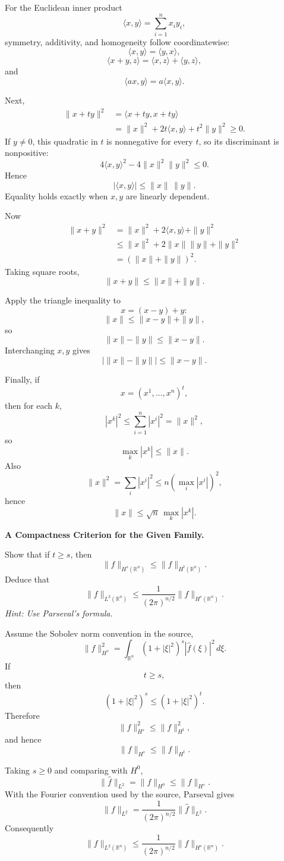 \begin{solution}
For the Euclidean inner product
\[
\langle x,y\rangle
=
\sum_{i=1}^{n}x_i y_i,
\]
symmetry, additivity, and homogeneity follow coordinatewise:
\[
\langle x,y\rangle=\langle y,x\rangle,
\]
\[
\langle x+y,z\rangle
=
\langle x,z\rangle+\langle y,z\rangle,
\]
and
\[
\langle ax,y\rangle
=
a\langle x,y\rangle.
\]

Next,
\[
\begin{aligned}
\|x+ty\|^2
&=
\langle x+ty,x+ty\rangle\\
&=
\|x\|^2+2t\langle x,y\rangle+t^2\|y\|^2
\ge0.
\end{aligned}
\]
If \(y\neq0\), this quadratic in \(t\) is nonnegative for every \(t\), so its discriminant is
nonpositive:
\[
4\langle x,y\rangle^2
-
4\|x\|^2\|y\|^2
\le0.
\]
Hence
\[
\boxed{
|\langle x,y\rangle|
\le
\|x\|\,\|y\|.
}
\]
Equality holds exactly when \(x,y\) are linearly dependent.

Now
\[
\begin{aligned}
\|x+y\|^2
&=
\|x\|^2+2\langle x,y\rangle+\|y\|^2\\
&\le
\|x\|^2+2\|x\|\|y\|+\|y\|^2\\
&=
(\|x\|+\|y\|)^2.
\end{aligned}
\]
Taking square roots,
\[
\boxed{\|x+y\|\le\|x\|+\|y\|.}
\]

Apply the triangle inequality to
\[
x=(x-y)+y:
\]
\[
\|x\|
\le
\|x-y\|+\|y\|,
\]
so
\[
\|x\|-\|y\|
\le
\|x-y\|.
\]
Interchanging \(x,y\) gives
\[
\boxed{
|\|x\|-\|y\||
\le
\|x-y\|.
}
\]

Finally, if
\[
x=(x^1,\ldots,x^n)^t,
\]
then for each \(k\),
\[
|x^k|^2
\le
\sum_{i=1}^{n}|x^i|^2
=
\|x\|^2,
\]
so
\[
\boxed{\max_k|x^k|\le\|x\|.}
\]
Also
\[
\|x\|^2
=
\sum_i|x^i|^2
\le
n\left(\max_i|x^i|\right)^2,
\]
hence
\[
\boxed{
\|x\|
\le
\sqrt n\,\max_k|x^k|.
}
\]
\end{solution}


\begin{problem}[CP-II-0275]
\label{prob:cp-ii-0275}
\textbf{A Compactness Criterion for the Given Family.}

\hspace*{1.5em}Show that if $t \ge s$, then
	\[
	\|f\|_{H^{s}(\mathbb{R}^n)} \le \|f\|_{H^{t}(\mathbb{R}^n)}.
	\]
	Deduce that
	\[
	\|f\|_{L^2(\mathbb{R}^n)}
	\le \frac{1}{(2\pi)^{n/2}}\|f\|_{H^{s}(\mathbb{R}^n)}.
	\]
	\emph{Hint: Use Parseval's formula.}
\end{problem}

\begin{solution}
Assume the Sobolev norm convention in the source,
\[
\|f\|_{H^s}^2
=
\int_{\mathbb R^n}
(1+|\xi|^2)^s
|\widehat f(\xi)|^2\,d\xi.
\]
If
\[
t\ge s,
\]
then
\[
(1+|\xi|^2)^s
\le
(1+|\xi|^2)^t.
\]
Therefore
\[
\|f\|_{H^s}^2
\le
\|f\|_{H^t}^2,
\]
and hence
\[
\boxed{
\|f\|_{H^s}
\le
\|f\|_{H^t}.
}
\]

Taking \(s\ge0\) and comparing with \(H^0\),
\[
\|\widehat f\|_{L^2}
=
\|f\|_{H^0}
\le
\|f\|_{H^s}.
\]
With the Fourier convention used by the source, Parseval gives
\[
\|f\|_{L^2}
=
\frac1{(2\pi)^{n/2}}
\|\widehat f\|_{L^2}.
\]
Consequently
\[
\boxed{
\|f\|_{L^2(\mathbb R^n)}
\le
\frac1{(2\pi)^{n/2}}
\|f\|_{H^s(\mathbb R^n)}.
}
\]
\end{solution}


